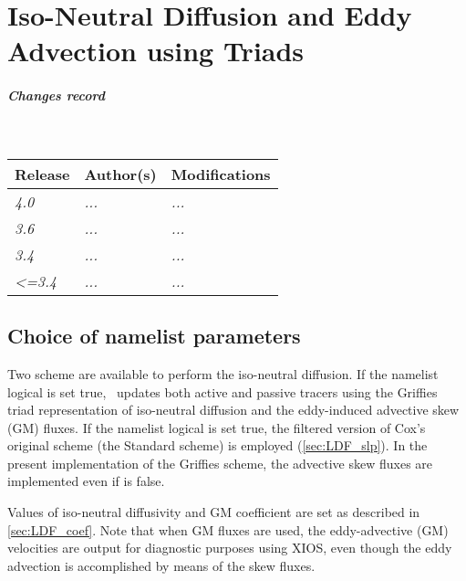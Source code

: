 \documentclass[../main/NEMO_manual]{subfiles}
\begin{document}
\chapter{Iso-Neutral Diffusion and Eddy Advection using Triads}
\label{apdx:TRIADS}

\thispagestyle{plain}

\chaptertoc

\paragraph{Changes record} ~\\

{\footnotesize
  \begin{tabularx}{\textwidth}{l||X|X}
    Release & Author(s) & Modifications \\
    \hline
    {\em   4.0} & {\em ...} & {\em ...} \\
    {\em   3.6} & {\em ...} & {\em ...} \\
    {\em   3.4} & {\em ...} & {\em ...} \\
    {\em <=3.4} & {\em ...} & {\em ...}
  \end{tabularx}
}

\clearpage

\section[Choice of \forcode{namtra\_ldf} namelist parameters]{Choice of \protect{} namelist parameters}

Two scheme are available to perform the iso-neutral diffusion.
If the namelist logical  is set true,
\NEMO\ updates both active and passive tracers using the Griffies triad representation of iso-neutral diffusion and
the eddy-induced advective skew (GM) fluxes.
If the namelist logical  is set true,
the filtered version of Cox's original scheme (the Standard scheme) is employed (\autoref{sec:LDF_slp}).
In the present implementation of the Griffies scheme,
the advective skew fluxes are implemented even if  is false.

Values of iso-neutral diffusivity and GM coefficient are set as described in \autoref{sec:LDF_coef}.
Note that when GM fluxes are used, the eddy-advective (GM) velocities are output for diagnostic purposes using XIOS,
even though the eddy advection is accomplished by means of the skew fluxes.
\end{document}
